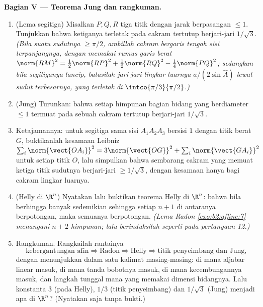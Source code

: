 \begin{problem}
\medskip
\noindent\textbf{Bagian V --- Teorema Jung dan rangkuman.}
\begin{enumerate}[resume]
  \item (Lema segitiga) Misalkan $P, Q, R$ tiga titik dengan
        jarak berpasangan $\leq 1$. Tunjukkan bahwa ketiganya terletak pada
        cakram tertutup berjari-jari $1/\sqrt3$. \emph{(Bila suatu
        sudutnya $\geq \pi/2$, ambillah cakram bergaris tengah sisi
        terpanjangnya, dengan memakai rumus garis berat
        $\norm{RM}^2 = \tfrac12\norm{RP}^2 +
        \tfrac12\norm{RQ}^2 - \tfrac14\norm{PQ}^2$; sedangkan bila
        segitiganya lancip, batasilah jari-jari lingkar luarnya $a/(2\sin
        \widehat A)$ lewat sudut terbesarnya, yang terletak di
        $\intco{\pi/3}{\pi/2}$.)}
  \item (Jung) Turunkan: bahwa setiap himpunan bagian  bidang yang
        berdiameter $\leq 1$ termuat pada sebuah cakram tertutup
        berjari-jari $1/\sqrt3$.
  \item Ketajamannya: untuk segitiga sama sisi $A_1A_2A_3$
        bersisi $1$ dengan titik berat $G$, buktikanlah kesamaan
        Leibniz $\sum_i \norm{\vect{OA_i}}^2 =
        3\norm{\vect{OG}}^2 + \sum_i \norm{\vect{GA_i}}^2$
        untuk setiap titik $O$, lalu simpulkan bahwa sembarang cakram yang
        memuat ketiga titik sudutnya berjari-jari $\geq
        1/\sqrt3$, dengan kesamaan hanya bagi cakram lingkar luarnya.
  \item (Helly di $\R^n$) Nyatakan lalu buktikan teorema Helly di
        $\R^n$: bahwa bila berhingga banyak  sedemikian sehingga
        setiap $n + 1$ di antaranya berpotongan, maka semuanya
        berpotongan. \emph{(Lema Radon
        \cref{exo:b2:affine:7} menangani $n + 2$ himpunan; lalu
        berinduksilah seperti pada pertanyaan 12.)}
  \item Rangkuman. Rangkailah rantainya
        \[
        \text{kebergantungan afin} \Rightarrow \text{Radon}
        \Rightarrow \text{Helly} \Rightarrow
        \text{titik penyeimbang dan Jung},
        \]
        dengan menunjukkan dalam satu kalimat masing-masing: di mana aljabar linear
        masuk, di mana tanda bobotnya masuk, di mana
        kecembungannya masuk, dan langkah tunggal mana yang memakai
        dimensi bidangnya. Lalu konstanta $3$ (pada
        Helly), $1/3$ (titik penyeimbang) dan $1/\sqrt3$ (Jung)
        menjadi apa di $\R^n$? (Nyatakan saja tanpa bukti.)

\end{enumerate}
\end{problem}
